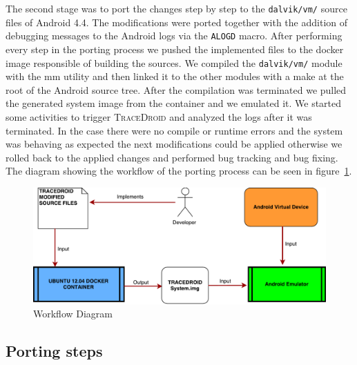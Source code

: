 The second stage was to port the changes step by step to the
\texttt{dalvik/vm/} source files of Android 4.4. The modifications were ported
together with the addition of debugging messages to the Android logs
via the \texttt{ALOGD} macro. After performing every step in the porting
process we pushed the implemented files to the docker image
responsible of building the sources. We compiled the \texttt{dalvik/vm/} module
with the mm utility and then linked it to the other modules with a
make at the root of the Android source tree. After the compilation was
terminated we pulled the generated system image from the container and
we emulated it. We started some activities to trigger \textsc{TraceDroid} and
analyzed the logs after it was terminated. In the case there were no
compile or runtime errors and the system was behaving as expected the
next modifications could be applied otherwise we rolled back to the
applied changes and performed bug tracking and bug fixing. The diagram
showing the workflow of the porting process can be seen in figure~\ref{fig:porting_workflow}.

\begin{figure}[!h]
    \centering
    \includegraphics[width=1\textwidth]{./img/porting/flowDiagram.pdf}
    \caption{Workflow Diagram}
    \label{fig:porting_workflow}
\end{figure}

\subsection{Porting steps}
\label{sec:porting_step}

